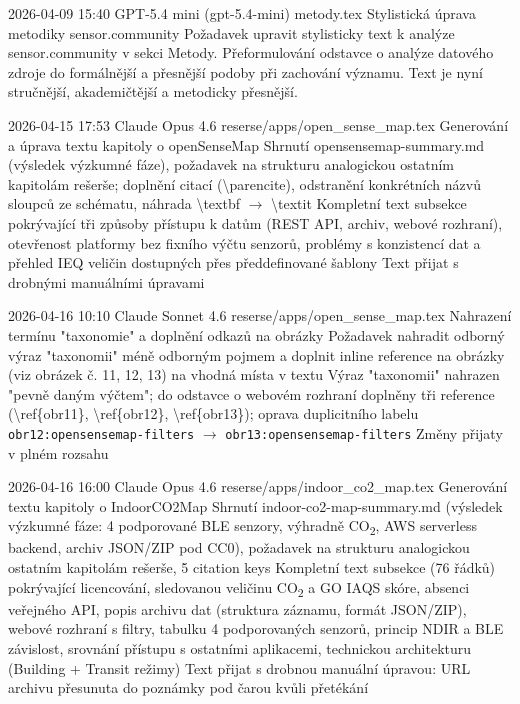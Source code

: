 \logentry
  {2026-04-09 15:40}
  {GPT-5.4 mini (gpt-5.4-mini)}
  {metody.tex}
  {Stylistická úprava metodiky sensor.community}
  {Požadavek upravit stylisticky text k analýze sensor.community v sekci Metody.}
  {Přeformulování odstavce o analýze datového zdroje do formálnější a přesnější podoby při zachování významu.}
  {Text je nyní stručnější, akademičtější a metodicky přesnější.}

\logentry
  {2026-04-15 17:53}
  {Claude Opus 4.6}
  {reserse/apps/open\_sense\_map.tex}
  {Generování a úprava textu kapitoly o openSenseMap}
  {Shrnutí opensensemap-summary.md (výsledek výzkumné fáze), požadavek na strukturu analogickou ostatním kapitolám rešerše; doplnění citací (\textbackslash parencite), odstranění konkrétních názvů sloupců ze schématu, náhrada \textbackslash textbf $\rightarrow$ \textbackslash textit}
  {Kompletní text subsekce pokrývající tři způsoby přístupu k datům (REST API, archiv, webové rozhraní), otevřenost platformy bez fixního výčtu senzorů, problémy s konzistencí dat a přehled IEQ veličin dostupných přes předdefinované šablony}
  {Text přijat s drobnými manuálními úpravami}

\logentry
  {2026-04-16 10:10}
  {Claude Sonnet 4.6}
  {reserse/apps/open\_sense\_map.tex}
  {Nahrazení termínu "taxonomie" a doplnění odkazů na obrázky}
  {Požadavek nahradit odborný výraz "taxonomii" méně odborným pojmem a doplnit inline reference na obrázky (viz obrázek č. 11, 12, 13) na vhodná místa v textu}
  {Výraz "taxonomii" nahrazen "pevně daným výčtem"; do odstavce o webovém rozhraní doplněny tři reference (\textbackslash ref\{obr11\}, \textbackslash ref\{obr12\}, \textbackslash ref\{obr13\}); oprava duplicitního labelu \texttt{obr12:opensensemap-filters} $\rightarrow$ \texttt{obr13:opensensemap-filters}}
  {Změny přijaty v plném rozsahu}

\logentry
  {2026-04-16 16:00}
  {Claude Opus 4.6}
  {reserse/apps/indoor\_co2\_map.tex}
  {Generování textu kapitoly o IndoorCO2Map}
  {Shrnutí indoor-co2-map-summary.md (výsledek výzkumné fáze: 4 podporované BLE senzory, výhradně CO\textsubscript{2}, AWS serverless backend, archiv JSON/ZIP pod CC0), požadavek na strukturu analogickou ostatním kapitolám rešerše, 5 citation keys}
  {Kompletní text subsekce (76 řádků) pokrývající licencování, sledovanou veličinu CO\textsubscript{2} a GO IAQS skóre, absenci veřejného API, popis archivu dat (struktura záznamu, formát JSON/ZIP), webové rozhraní s filtry, tabulku 4 podporovaných senzorů, princip NDIR a BLE závislost, srovnání přístupu s ostatními aplikacemi, technickou architekturu (Building + Transit režimy)}
  {Text přijat s drobnou manuální úpravou: URL archivu přesunuta do poznámky pod čarou kvůli přetékání}

